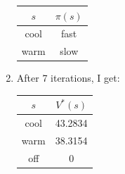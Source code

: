 \documentclass[11pt]{article}
\begin{document}
\begin{enumerate}
  \begin{tabular}{ | c | c | }
    \hline
    $s$ & $\pi(s)$ \\ \hline
    cool & fast \\ \hline
    warm & slow \\
    \hline
  \end{tabular}

\item After 7 iterations, I get:

  \begin{tabular}{ | c | c | }
    \hline
    $s$ & $V^*(s)$ \\ \hline
    cool & 43.2834 \\ \hline
    warm & 38.3154 \\ \hline
    off & 0 \\
    \hline
  \end{tabular}

\end{enumerate}
\end{document}
